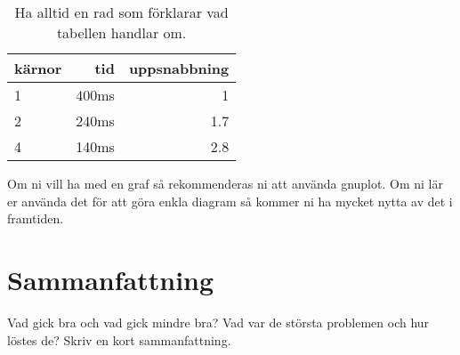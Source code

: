\documentclass[a4paper, 11pt]{article}
\begin{document}
\begin{table}
\centering
\begin{tabular}{|l|r|r|}  
\hline
kärnor & tid & uppsnabbning\\
\hline
1 & 400ms & 1\\
\hline
2 & 240ms & 1.7\\
\hline
4 & 140ms & 2.8\\
\hline
\end{tabular}
\caption{Ha alltid en rad som förklarar vad tabellen handlar om.}
\label{tab:results}
\end{table}

Om ni vill ha med en graf så rekommenderas ni att använda gnuplot. Om
ni lär er använda det för att göra enkla diagram så kommer ni ha
mycket nytta av det i framtiden.


\section{Sammanfattning}

Vad gick bra och vad gick mindre bra? Vad var de största problemen och
hur löstes de? Skriv en kort sammanfattning.
\end{document}
